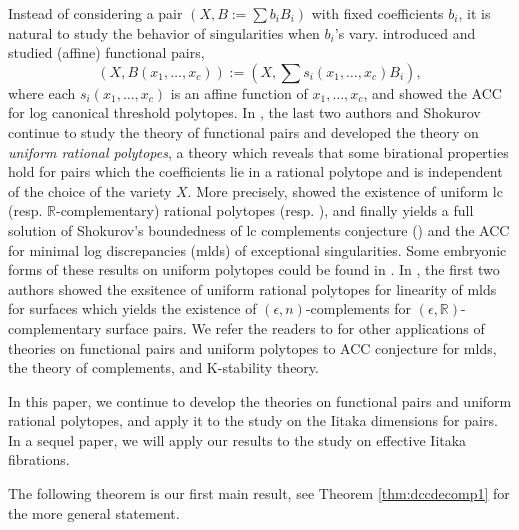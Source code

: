 \documentclass[11pt]{amsart}
\numberwithin{equation}{section}
\newcommand{\Rr}{\mathbb{R}}
\theoremstyle{definition}
\theoremstyle{definition}
\begin{document}
Instead of considering a pair $(X,B:=\sum b_iB_i)$ with fixed coefficients $b_i$, it is natural to study the behavior of singularities when $b_i$'s vary. \cite{HLQ21} introduced and studied (affine) functional pairs, 
$$(X,B(x_1,\ldots,x_c)):=(X,\sum s_i(x_1,\ldots,x_c)B_i),$$ 
where each $s_i(x_1,\ldots,x_c)$ is an affine function of $x_1,\ldots,x_c$, and showed the ACC for log canonical threshold polytopes. In \cite{HLS19}, the last two authors and Shokurov continue to study the theory of functional pairs and developed the theory on \emph{uniform rational polytopes}, a theory which reveals that some birational properties hold for pairs which the coefficients lie in a rational polytope and is independent of the choice of the variety $X$. More precisely, \cite{HLS19} showed the existence of uniform lc (resp. $\Rr$-complementary) rational polytopes \cite[Corollary 5.5]{HLS19}  (resp. \cite[Theorem 5.15]{HLS19}), and finally yields a full solution of Shokurov's boundedness of lc complements conjecture (\cite{Bir19,PS01,PS09,Sho92,Sho00,Sho20}) and the ACC for minimal log discrepancies (mlds) of exceptional singularities. Some embryonic forms of these results on uniform polytopes could be found in \cite{Nak16,Liu18}.
In \cite{CH21}, the first two authors showed the exsitence of uniform rational polytopes for linearity of mlds for surfaces which yields the existence of $(\epsilon, n)$-complements for $(\epsilon, \Rr)$-complementary surface pairs. We refer the readers to \cite{Che20,CX22,HL22,HLL22,HLQ20,Jia20} for other applications of theories on functional pairs and uniform polytopes to ACC conjecture for mlds, the theory of complements, and K-stability theory.


In this paper, we continue to develop the theories on functional pairs and uniform rational polytopes, and apply it to the study on the Iitaka dimensions for pairs. In a sequel paper, we will apply our results to the study on effective Iitaka fibrations.

\medskip

The following theorem is our first main result, see Theorem \ref{thm:dccdecomp1} for the more general statement.
\end{document}
